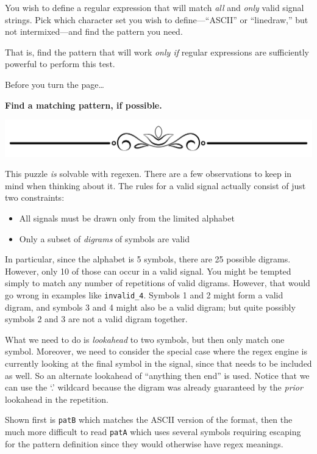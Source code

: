 You wish to define a regular expression that will match \emph{all} and
\emph{only} valid signal strings. Pick which character set you wish to
define---``ASCII'' or ``linedraw,'' but not intermixed---and find the
pattern you need.

That is, find the pattern that will work \emph{only if} regular
expressions are sufficiently powerful to perform this test.

Before you turn the page\ldots{}

\textbf{Find a matching pattern, if possible.}

\includegraphics{images/Elegant-Flourish-Frame-Extrapolated-19.svg}

\newpage

This puzzle \emph{is} solvable with regexen. There are a few
observations to keep in mind when thinking about it. The rules for a
valid signal actually consist of just two constraints:

\begin{itemize}
\tightlist
\item
  All signals must be drawn only from the limited alphabet
\item
  Only a subset of \emph{digrams} of symbols are valid
\end{itemize}

In particular, since the alphabet is 5 symbols, there are 25 possible
digrams. However, only 10 of those can occur in a valid signal. You
might be tempted simply to match any number of repetitions of valid
digrams. However, that would go wrong in examples like
\texttt{invalid\_4}. Symbols 1 and 2 might form a valid digram, and
symbols 3 and 4 might also be a valid digram; but quite possibly symbols
2 and 3 are not a valid digram together.

What we need to do is \emph{lookahead} to two symbols, but then only
match one symbol. Moreover, we need to consider the special case where
the regex engine is currently looking at the final symbol in the signal,
since that needs to be included as well. So an alternate lookahead of
``anything then end'' is used. Notice that we can use the `.' wildcard
because the digram was already guaranteed by the \emph{prior} lookahead
in the repetition.

Shown first is \texttt{patB} which matches the ASCII version of the
format, then the much more difficult to read \texttt{patA} which uses
several symbols requiring escaping for the pattern definition since they
would otherwise have regex meanings.

